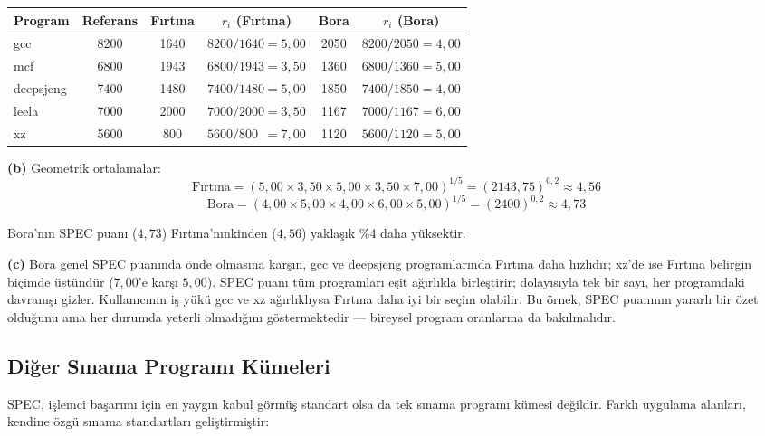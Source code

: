 \begin{ornek}[2.9]
\begin{center}
\small
\begin{tabular}{lccccc}
\toprule
\textbf{Program} & \textbf{Referans} & \textbf{Fırtına} & $r_i$ \textbf{(Fırtına)} & \textbf{Bora} & $r_i$ \textbf{(Bora)} \\
\midrule
gcc         & 8200 & 1640 & $8200/1640 = 5{,}00$ & 2050 & $8200/2050 = 4{,}00$ \\
mcf         & 6800 & 1943 & $6800/1943 = 3{,}50$ & 1360 & $6800/1360 = 5{,}00$ \\
deepsjeng   & 7400 & 1480 & $7400/1480 = 5{,}00$ & 1850 & $7400/1850 = 4{,}00$ \\
leela       & 7000 & 2000 & $7000/2000 = 3{,}50$ & 1167 & $7000/1167 = 6{,}00$ \\
xz          & 5600 & 800  & $5600/800\;\: = 7{,}00$ & 1120 & $5600/1120 = 5{,}00$ \\
\bottomrule
\end{tabular}
\end{center}

\textbf{(b)} Geometrik ortalamalar:
\[
\text{Fırtına} = (5{,}00 \times 3{,}50 \times 5{,}00 \times 3{,}50 \times 7{,}00)^{1/5} = (2143{,}75)^{0{,}2} \approx 4{,}56
\]
\[
\text{Bora} = (4{,}00 \times 5{,}00 \times 4{,}00 \times 6{,}00 \times 5{,}00)^{1/5} = (2400)^{0{,}2} \approx 4{,}73
\]

Bora'nın SPEC puanı ($4{,}73$) Fırtına'nınkinden ($4{,}56$) yaklaşık \%4 daha yüksektir.

\textbf{(c)} Bora genel SPEC puanında önde olmasına karşın, gcc ve deepsjeng programlarında Fırtına daha hızlıdır; xz'de ise Fırtına belirgin biçimde üstündür ($7{,}00$'e karşı $5{,}00$). SPEC puanı tüm programları eşit ağırlıkla birleştirir; dolayısıyla tek bir sayı, her programdaki davranışı gizler. Kullanıcının iş yükü gcc ve xz ağırlıklıysa Fırtına daha iyi bir seçim olabilir. Bu örnek, SPEC puanının yararlı bir özet olduğunu ama her durumda yeterli olmadığını göstermektedir --- bireysel program oranlarına da bakılmalıdır.
\end{ornek}

\subsection{Diğer Sınama Programı Kümeleri}
\label{subsec:diger-sinama}

SPEC, işlemci başarımı için en yaygın kabul görmüş standart olsa da tek sınama programı kümesi değildir. Farklı uygulama alanları, kendine özgü sınama standartları geliştirmiştir:


